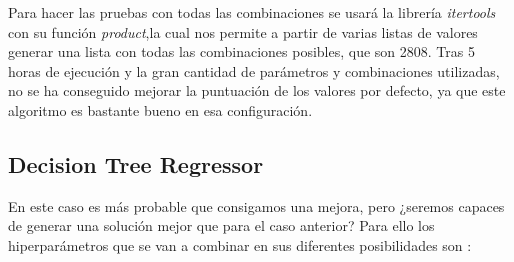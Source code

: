 Para hacer las pruebas con todas las combinaciones se usará la librería \textit{itertools} con su función \textit{product},la cual nos permite a partir de varias listas de valores generar una lista con todas las combinaciones posibles, que son 2808.
Tras 5 horas de ejecución y la gran cantidad de parámetros y combinaciones utilizadas, no se ha conseguido mejorar la puntuación de los valores por defecto, ya que este algoritmo es bastante bueno en esa configuración.

\subsection{Decision Tree Regressor}
En este caso es más probable que consigamos una mejora, pero ¿seremos capaces de generar una solución mejor que para el caso anterior?
Para ello los hiperparámetros que se van a combinar en sus diferentes posibilidades son \cite{sklearn:decisiontreeregressor}:
